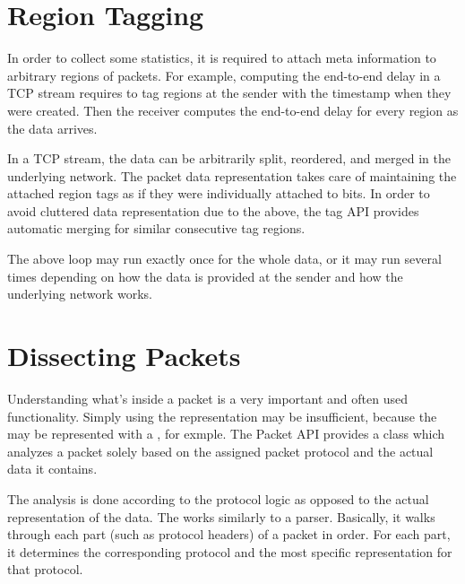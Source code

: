 
\section{Region Tagging}
\label{sec:packets:region-tagging}

In order to collect some statistics, it is required to attach meta information
to arbitrary regions of packets. For example, computing the end-to-end delay in
a TCP stream requires to tag regions at the sender with the timestamp when they
were created. Then the receiver computes the end-to-end delay for every region
as the data arrives.


In a TCP stream, the data can be arbitrarily split, reordered, and merged in the
underlying network. The packet data representation takes care of maintaining the
attached region tags as if they were individually attached to bits. In order to
avoid cluttered data representation due to the above, the tag API provides
automatic merging for similar consecutive tag regions.


The above loop may run exactly once for the whole data, or it may run several
times depending on how the data is provided at the sender and how the underlying
network works.

\section{Dissecting Packets}
\label{sec:packets:dissecting-packets}

Understanding what's inside a packet is a very important and often used
functionality. Simply using the representation may be insufficient, because the
 may be represented with a , for exmple.
The Packet API provides a  class which analyzes a
packet solely based on the assigned packet protocol and the actual data it
contains.

The analysis is done according to the protocol logic as opposed to the actual
representation of the data. The  works similarly to a
parser. Basically, it walks through each part (such as protocol headers) of a
packet in order. For each part, it determines the corresponding protocol and the
most specific representation for that protocol.

